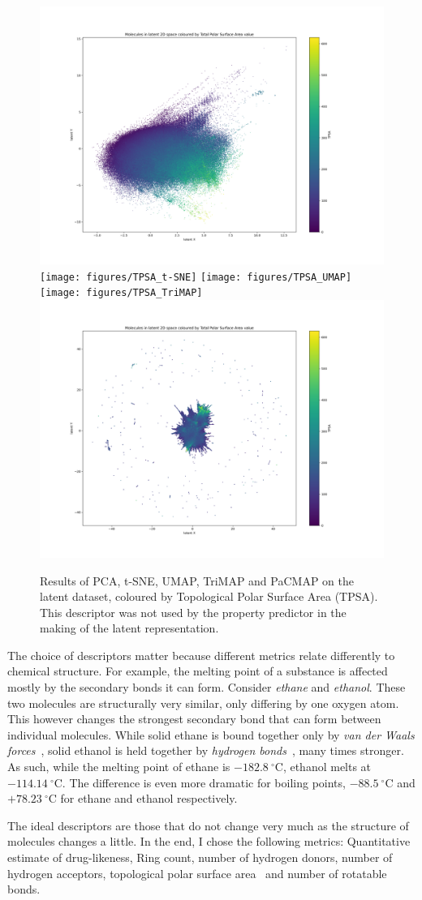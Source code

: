 \begin{figure}[!ht]
	\centering
	\includegraphics[width=0.49\columnwidth]{figures/TPSA_PCA}
	\texttt{[image: figures/TPSA\_t-SNE]}
	\texttt{[image: figures/TPSA\_UMAP]}
	\texttt{[image: figures/TPSA\_TriMAP]}
	\includegraphics[width=0.49\columnwidth]{figures/TPSA_PaCMAP}
	\caption{Results of PCA, t-SNE, UMAP, TriMAP and PaCMAP on the latent dataset, coloured by Topological Polar Surface Area (TPSA). This descriptor was not used by the property predictor in the making of the latent representation.}
	\label{fig:TPSA}
\end{figure}

The choice of descriptors matter because different metrics relate differently to chemical structure. For example, the melting point of a substance is affected mostly by the secondary bonds it can form. Consider \textit{ethane} and \textit{ethanol}. These two molecules are structurally very similar, only differing by one oxygen atom. This however changes the strongest secondary bond that can form between individual molecules. While solid ethane is bound together only by \textit{van der Waals forces}~\cite{bib:vanderwaals}, solid ethanol is held together by \textit{hydrogen bonds}~\cite{bib:hbond}, many times stronger. As such, while the melting point of ethane is $-182.8~^\circ$C, ethanol melts at $-114.14~^\circ$C. The difference is even more dramatic for boiling points, $-88.5~^\circ$C and $+78.23~^\circ$C for ethane and ethanol respectively.

The ideal descriptors are those that do not change very much as the structure of molecules changes a little. In the end, I chose the following metrics: Quantitative estimate of drug-likeness, Ring count, number of hydrogen donors, number of hydrogen acceptors, topological polar surface area~\cite{bib:tpsa} and number of rotatable bonds.

